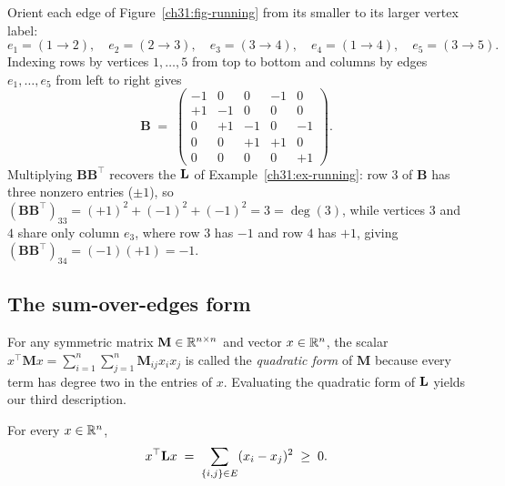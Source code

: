 \begin{example}\label{ch31:ex-incidence}
Orient each edge of Figure~\ref{ch31:fig-running} from its smaller to its larger vertex label:
\[
  e_1=(1\to2),\quad e_2=(2\to3),\quad e_3=(3\to4),\quad e_4=(1\to4),\quad e_5=(3\to5).
\]
Indexing rows by vertices $1,\dots,5$ from top to bottom and columns by edges $e_1,\dots,e_5$ from left to right gives
\[
  \mathbf{B} \;=\;
  \begin{pmatrix}
    -1 &  0 &  0 & -1 &  0 \\
    +1 & -1 &  0 &  0 &  0 \\
     0 & +1 & -1 &  0 & -1 \\
     0 &  0 & +1 & +1 &  0 \\
     0 &  0 &  0 &  0 & +1
  \end{pmatrix}.
\]
Multiplying $\mathbf{B}\mathbf{B}^\top$ recovers the $\mathbf{L}$ of Example~\ref{ch31:ex-running}: row $3$ of $\mathbf{B}$ has three nonzero entries ($\pm 1$), so $(\mathbf{B}\mathbf{B}^\top)_{33} = (+1)^2 + (-1)^2 + (-1)^2 = 3 = \deg(3)$, while vertices $3$ and $4$ share only column $e_3$, where row $3$ has $-1$ and row $4$ has $+1$, giving $(\mathbf{B}\mathbf{B}^\top)_{34} = (-1)(+1) = -1$.
\end{example}

\subsection{The sum-over-edges form}

For any symmetric matrix $\mathbf{M} \in \mathbb{R}^{n\times n}$ and vector $x \in \mathbb{R}^n$, the scalar $x^\top \mathbf{M} x = \sum_{i=1}^n \sum_{j=1}^n \mathbf{M}_{ij} x_i x_j$ is called the \emph{quadratic form} of $\mathbf{M}$ because every term has degree two in the entries of $x$. Evaluating the quadratic form of $\mathbf{L}$ yields our third description.

\begin{theorem}\label{ch31:thm-quadform}
For every $x\in\mathbb{R}^n$,
\[
  x^\top \mathbf{L} x \;=\; \sum_{\{i,j\}\in E} (x_i - x_j)^2 \;\ge\; 0 .
\]
\end{theorem}

